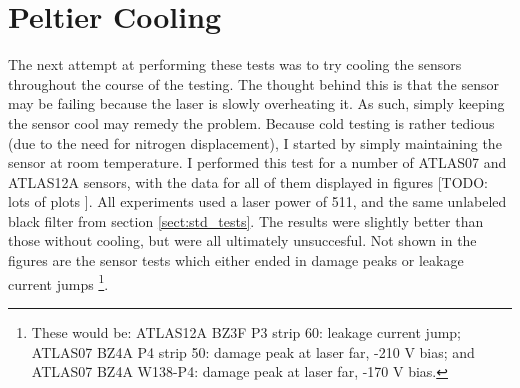 \documentclass{report}
\begin{document}
            

        \section{Peltier Cooling}
            The next attempt at performing these tests was to try cooling the sensors throughout the course of the testing. The thought behind this is that the sensor may be failing because the laser is slowly overheating it. As such, simply keeping the sensor cool may remedy the problem. Because cold testing is rather tedious (due to the need for nitrogen displacement), I started by simply maintaining the sensor at room temperature. I performed this test for a number of ATLAS07 and ATLAS12A sensors, with the data for all of them displayed in figures [TODO: lots of plots
            ]. All experiments used a laser power of 511, and the same unlabeled black filter from section \ref{sect:std_tests}. The results were slightly better than those without cooling, but were all ultimately unsuccesful. Not shown in the figures are the sensor tests which either ended in damage peaks or leakage current jumps \footnote{These would be: ATLAS12A BZ3F P3 strip 60: leakage current jump; ATLAS07 BZ4A P4 strip 50: damage peak at laser far, -210 V bias; and ATLAS07 BZ4A W138-P4: damage peak at laser far, -170 V bias.}.
\end{document}

